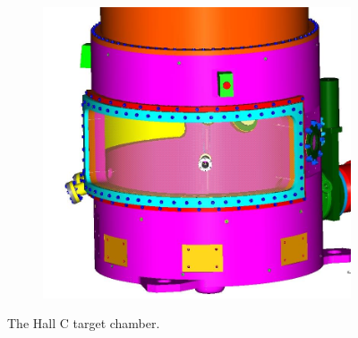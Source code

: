 \begin{figure}[h]
\begin{subfigure}[b]{0.4\textwidth}
        \includegraphics[width=\textwidth]{chap3/target_chamber2.jpg}
        \label{fig:target_chamber2}
    \end{subfigure}
    \caption{The Hall  C target chamber.
             }
    \label{fig:target_chamber}
\end{figure}

